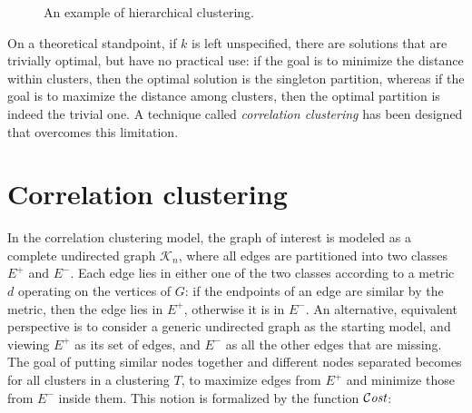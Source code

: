 \begin{figure}[ht]
    \caption{An example of hierarchical clustering.}
    \label{fig:hierarchical-clustering-ex}
\end{figure}

On a theoretical standpoint, if $k$ is left unspecified, there are solutions that are trivially optimal, but have no practical use: if the goal is to minimize the distance within clusters, then the optimal solution is the singleton partition, whereas if the goal is to maximize the distance among clusters, then the optimal partition is indeed the trivial one. A technique called \textit{correlation clustering} has been designed that overcomes this limitation.


\section{Correlation clustering}\label{sec:corr-clust}

In the correlation clustering model, the graph of interest is modeled as a complete undirected graph $\mathcal{K}_n$, where all edges are partitioned into two classes $E^+$ and $E^-$. Each edge lies in either one of the two classes according to a metric $d$ operating on the vertices of $G$: if the endpoints of an edge are similar by the metric, then the edge lies in $E^+$, otherwise it is in $E^-$. An alternative, equivalent perspective is to consider a generic undirected graph as the starting model, and viewing $E^+$ as its set of edges, and $E^-$ as all the other edges that are missing.
The goal of putting similar nodes together and different nodes separated becomes for all clusters in a clustering $T$, to maximize edges from $E^+$ and minimize those from $E^-$ inside them. This notion is formalized by the function $\mathcal{C}\textit{ost}$:

